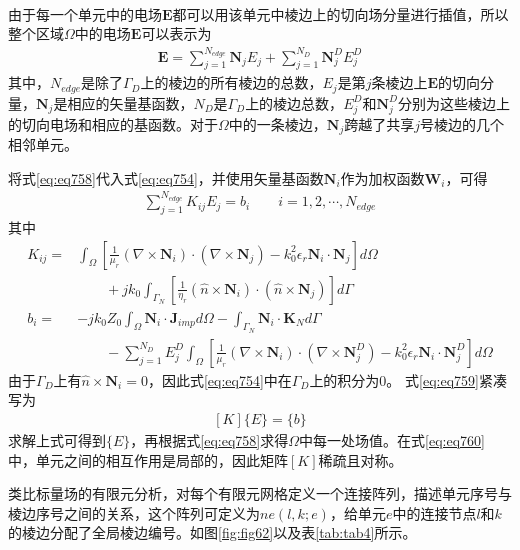 \documentclass{article}
\numberwithin{equation}{section}
\begin{document}
\\
由于每一个单元中的电场$\mathbf{E}$都可以用该单元中棱边上的切向场分量进行插值，所以整个区域$\Omega$中的电场$\mathbf{E}$可以表示为
\begin{align}
    \label{eq:eq758}
    \mathbf{E}=\sum_{j=1}^{N_{edge}}\mathbf{N}_jE_j+\sum_{j=1}^{N_{D}}\mathbf{N}_j^DE_j^D
\end{align}
其中，$N_{edge}$是除了$\Gamma_D$上的棱边的所有棱边的总数，$E_j$是第$j$条棱边上$\mathbf{E}$的切向分量，$\mathbf{N}_j$是相应的矢量基函数，$N_{D}$是$\Gamma_D$上的棱边总数，$E_j^D$和$\mathbf{N}_j^D$分别为这些棱边上的切向电场和相应的基函数。对于$\Omega$中的一条棱边，$\mathbf{N}_j$跨越了共享$j$号棱边的几个相邻单元。\par
将式\ref{eq:eq758}代入式\ref{eq:eq754}，并使用矢量基函数$\mathbf{N}_i$作为加权函数$\mathbf{W}_i$，可得
\begin{align}
    \label{eq:eq759}
    \sum_{j=1}^{N_{edge}}K_{ij}E_j=b_i\qquad i=1,2,\cdots,N_{edge}
\end{align}
其中\begin{align}
    \label{eq:eq760}
    K_{ij}=&\int_{\Omega}\left[\frac{1}{\mu_r}\left(\nabla\times\mathbf{N}_i\right)\cdot\left(\nabla\times\mathbf{N}_j\right)-k_0^2\epsilon_r\mathbf{N}_i\cdot\mathbf{N}_j\right]d\Omega \nonumber \\
           &\qquad+jk_0\int_{\Gamma_N}\left[\frac{1}{\eta_r}\left(\hat{n}\times\mathbf{N}_i\right)\cdot\left(\hat{n}\times\mathbf{N}_j\right)\right]d\Gamma \\
    \label{eq:eq761}
    b_i=&-jk_0Z_0\int_{\Omega}\mathbf{N}_i\cdot\mathbf{J}_{imp}d\Omega-\int_{\Gamma_N}\mathbf{N}_i\cdot\mathbf{K}_Nd\Gamma \nonumber \\
        &\qquad-\sum_{j=1}^{N_D}E_j^D\int_{\Omega}\left[\frac{1}{\mu_r}\left(\nabla\times\mathbf{N}_i\right)\cdot\left(\nabla\times\mathbf{N}_j^D\right)-k_0^2\epsilon_r\mathbf{N}_i\cdot\mathbf{N}_j^D\right]d\Omega
\end{align}
由于$\Gamma_D$上有$\hat{n}\times\mathbf{N}_i=0$，因此式\ref{eq:eq754}中在$\Gamma_D$上的积分为0。
式\ref{eq:eq759}紧凑写为
\begin{align}
    \label{eq:eq763}
    [K]\{E\}=\{b\}
\end{align}
求解上式可得到$\{E\}$，再根据式\ref{eq:eq758}求得$\Omega$中每一处场值。在式\ref{eq:eq760}中，单元之间的相互作用是局部的，因此矩阵$[K]$稀疏且对称。\par
类比标量场的有限元分析，对每个有限元网格定义一个连接阵列，描述单元序号与棱边序号之间的关系，这个阵列可定义为$ne(l,k;e)$，给单元$e$中的连接节点$l$和$k$的棱边分配了全局棱边编号。如图\ref{fig:fig62}以及表\ref{tab:tab4}所示。
\end{document}
